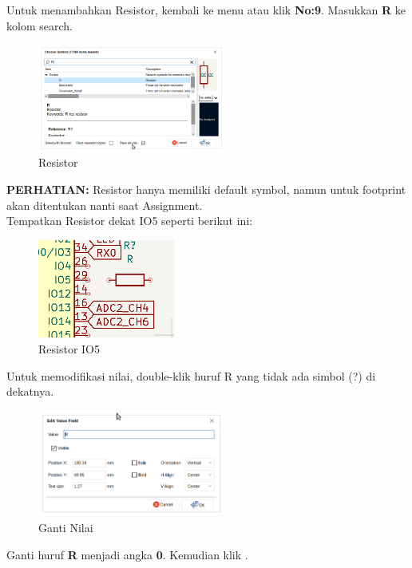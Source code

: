 \documentclass[12pt]{book}
\begin{document}
	Untuk menambahkan Resistor, kembali ke menu  atau klik \textbf{No:9}.
	Masukkan \textbf{R} ke kolom search.

	\begin{figure}[!ht]
		\centering
		\includegraphics[width=0.55\textwidth]{images/sch/sch_9}
		\caption{Resistor}
	\end{figure}

	\textbf{PERHATIAN:} Resistor hanya memiliki default symbol, namun untuk footprint akan
	ditentukan nanti saat Assignment.\\

	Tempatkan Resistor dekat IO5 seperti berikut ini:
	\begin{figure}[!ht]
		\centering
		\includegraphics[width=0.4\textwidth]{images/sch/sch_10}
		\caption{Resistor IO5}
	\end{figure}

	Untuk memodifikasi nilai, double-klik huruf R yang tidak ada simbol (?) di dekatnya.
	\begin{figure}[!ht]
		\centering
		\includegraphics[width=0.55\textwidth]{images/sch/sch_11}
		\caption{Ganti Nilai}
	\end{figure}

	Ganti huruf \textbf{R} menjadi angka \textbf{0}. Kemudian klik .
\end{document}
